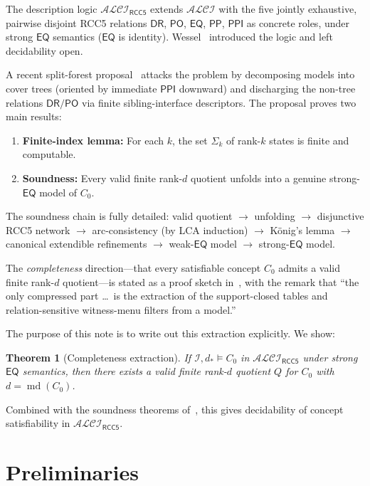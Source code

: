 \documentclass[11pt]{article}
\newtheorem{theorem}{Theorem}[section]
\theoremstyle{definition}
\theoremstyle{remark}
\newcommand{\DR}{\mathsf{DR}}
\newcommand{\PO}{\mathsf{PO}}
\newcommand{\PP}{\mathsf{PP}}
\newcommand{\PPI}{\mathsf{PPI}}
\newcommand{\EQ}{\mathsf{EQ}}
\newcommand{\md}{\operatorname{md}}
\newcommand{\ALCIRCC}[1]{\mathcal{ALCI}_{\mathsf{RCC#1}}}
\begin{document}
The description logic $\ALCIRCC{5}$ extends $\mathcal{ALCI}$ with
the five jointly exhaustive, pairwise disjoint RCC5 relations
$\DR$, $\PO$, $\EQ$, $\PP$, $\PPI$ as concrete roles, under
strong $\EQ$ semantics ($\EQ$ is identity).  Wessel~\cite{Wessel2001,Wessel2002,Wessel2003}
introduced the logic and left decidability open.

A recent split-forest proposal~\cite{SplitForest} attacks the problem
by decomposing models into cover trees (oriented by immediate $\PPI$
downward) and discharging the non-tree relations $\DR/\PO$ via finite
sibling-interface descriptors.  The proposal proves two main results:

\begin{enumerate}
\item \textbf{Finite-index lemma:} For each $k$, the set $\Sigma_k$
  of rank-$k$ states is finite and computable.
\item \textbf{Soundness:} Every valid finite rank-$d$ quotient unfolds
  into a genuine strong-$\EQ$ model of $C_0$.
\end{enumerate}

The soundness chain is fully detailed: valid quotient $\to$ unfolding
$\to$ disjunctive RCC5 network $\to$ arc-consistency (by LCA
induction) $\to$ K\"onig's lemma $\to$ canonical extendible
refinements $\to$ weak-$\EQ$ model $\to$ strong-$\EQ$ model.

\medskip
The \emph{completeness} direction---that every satisfiable concept
$C_0$ admits a valid finite rank-$d$ quotient---is stated as a proof
sketch in~\cite{SplitForest}, with the remark that ``the only
compressed part \ldots\ is the extraction of the support-closed tables
and relation-sensitive witness-menu filters from a model.''

The purpose of this note is to write out this extraction explicitly.
We show:

\begin{theorem}[Completeness extraction]\label{thm:main}
If\/ $\mathcal{I},d_\ast\models C_0$ in $\ALCIRCC{5}$ under
strong $\EQ$ semantics, then there exists a valid finite rank-$d$
quotient $Q$ for $C_0$ with $d=\md(C_0)$.
\end{theorem}

Combined with the soundness theorems of~\cite{SplitForest}, this
gives decidability of concept satisfiability in $\ALCIRCC{5}$.


\section{Preliminaries}
\label{sec:prelim}
\end{document}
